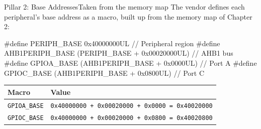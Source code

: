 \documentclass[9pt,aspectratio=169,xcolor=table]{beamer}
\begin{document}
\begin{frame}[fragile]{Pillar 2: Base Addresses}{Taken from the memory map}
    \leavevmode
    The vendor defines each peripheral's base address as a macro, built up from the memory map of Chapter 2:

    \vspace{2mm}
\begin{cc}[basicstyle=\ttfamily\footnotesize]
#define PERIPH_BASE      0x40000000UL                 // Peripheral region
#define AHB1PERIPH_BASE  (PERIPH_BASE + 0x00020000UL) // AHB1 bus
#define GPIOA_BASE       (AHB1PERIPH_BASE + 0x0000UL) // Port A
#define GPIOC_BASE       (AHB1PERIPH_BASE + 0x0800UL) // Port C
\end{cc}

    \vspace{2mm}
    \begin{center}
    {\small
    \striped
    \begin{tabular}{@{}l l@{}}
        \toprule
        \textbf{Macro} & \textbf{Value} \\
        \midrule
        \texttt{GPIOA\_BASE} & \texttt{0x40000000 + 0x00020000 + 0x0000 = 0x40020000} \\
        \texttt{GPIOC\_BASE} & \texttt{0x40000000 + 0x00020000 + 0x0800 = 0x40020800} \\
        \bottomrule
    \end{tabular}}
    \end{center}
\end{frame}
\end{document}
